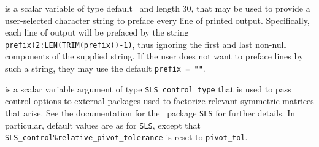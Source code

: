 \begin{description}
 is a scalar variable of type default \character\
and length 30, that may be used to provide a user-selected
character string to preface every line of printed output.
Specifically, each line of output will be prefaced by the string
{\tt prefix(2:LEN(TRIM(prefix))-1)},
thus ignoring the first and last non-null components of the
supplied string. If the user does not want to preface lines by such
a string, they may use the default {\tt prefix = ""}.

 is a scalar variable argument of type
{\tt SLS\_control\_type} that is used to pass control
options to external packages used to
factorize relevant symmetric matrices that arise.
See the documentation for the \galahad\ package {\tt SLS} for further details.
In particular, default values are as for {\tt SLS}, except that
{\tt SLS\_control\%rela\-tive\_pivot\_tolerance} is reset to
{\tt pivot\_tol}.

\end{description}
